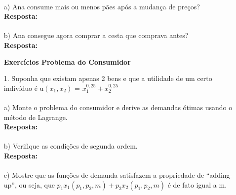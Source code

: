 \begin{enumerate}
\paragraph{} a) Ana consume mais ou menos pães após a mudança de preços?\\

\textbf{Resposta:}\\

\paragraph{} b) Ana consegue agora comprar a cesta que comprava antes?\\

\textbf{Resposta:}\\

\newpage

\begin{center}
\textbf{Exercícios Problema do Consumidor}\\
\end{center}

\item[1.]  Suponha que existam apenas 2 bens e que a utilidade de um certo indivíduo é u{$(x_1, x_2)$} = {$x_{1}^{0,25} + x_{2}^{0,25}$}\\

\paragraph{} a) Monte o problema do consumidor e derive as demandas ótimas usando o método de
Lagrange.\\

\textbf{Resposta:}\\

\paragraph{} b) Verifique as condições de segunda ordem.\\

\textbf{Resposta:}\\

\paragraph{} c) Mostre que as funções de demanda satisfazem a propriedade de “adding-up”, ou seja,
que {$p_1x_1(p_1, p_2, m) + p_2x_2(p_1, p_2, m)$} é de fato igual a m.\\


\end{enumerate}
